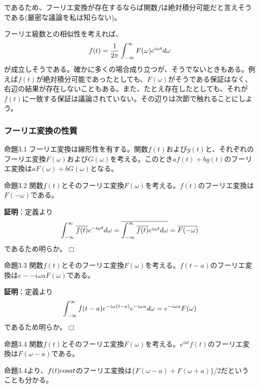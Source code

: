 \documentclass[dvipdfmx, 9pt, a4paper]{jsarticle}
\def\qed{\hfill $\Box$}
\begin{document}
であるため、フーリエ変換が存在するならば関数$f$は絶対積分可能だと言えそうである(厳密な議論を私は知らない)。\par
フーリエ級数との相似性を考えれば、
\begin{equation}
f(t)=\frac{1}{2\pi}\int_{-\infty}^\infty F(\omega)e^{i\omega t}d\omega \notag
\end{equation}
が成立しそうである。確かに多くの場合成り立つが、そうでないときもある。例えば$f(t)$が絶対積分可能であったとしても、$F(\omega)$がそうである保証はなく、右辺の結果が存在しないこともある。また、たとえ存在したとしても、それが$f(t)$に一致する保証は議論されていない。その辺りは次節で触れることにしよう。

\subsubsection{フーリエ変換の性質}
\begin{itembox}[l]{命題3.1}
フーリエ変換は線形性を有する。関数$f(t)$および$g(t)$と、それぞれのフーリエ変換$F(\omega)$および$G(\omega)$を考える。このとき$af(t)+bg(t)$のフーリエ変換は$aF(\omega)+bG(\omega)$となる。
\end{itembox}
\begin{itembox}[l]{命題3.2}
関数$f(t)$とそのフーリエ変換$F(\omega)$を考える。$\overline{f(t)}$のフーリエ変換は$\overline{F(-\omega)}$である。
\end{itembox}
{\bf 証明}：定義より
\begin{equation}
\int_{-\infty}^\infty \overline{f(t)}e^{-i\omega t}d\omega=\overline{\int_{-\infty}^\infty \overline{f(t)}e^{i\omega t}d\omega}=\overline{F(-\omega)} \notag
\end{equation}
であるため明らか。\qed
\begin{itembox}[l]{命題3.3}
関数$f(t)$とそのフーリエ変換$F(\omega)$を考える。$f(t-a)$のフーリエ変換は$e-{-i\omega a}F(\omega)$である。
\end{itembox}
{\bf 証明}：定義より
\begin{equation}
\int_{-\infty}^\infty f(t-a)e^{-i\omega (t-a)}e^{-i\omega a}d\omega=e^{-i\omega a}F(\omega) \notag
\end{equation}
であるため明らか。\qed
\begin{itembox}[l]{命題3.4}
関数$f(t)$とそのフーリエ変換$F(\omega)$を考える。$e^{iat}f(t)$のフーリエ変換は$F(\omega-a)$である。
\end{itembox}\par
命題3.4より、$f(t){\rm cos}at$のフーリエ変換は$\{F(\omega-a)+F(\omega+a)\}/2$だということも分かる。
\end{document}
